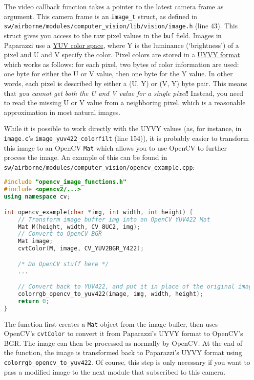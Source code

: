 \documentclass{article}
\begin{document}
The video callback function takes a pointer to the latest camera frame as argument.
This camera frame is an \texttt{image\_t} struct, as defined in \texttt{sw/airborne/modules/computer\_vision/lib/vision/image.h} (line 43).
This struct gives you access to the raw pixel values in the \texttt{buf} field.
Images in Paparazzi use a \href{https://en.wikipedia.org/wiki/YUV}{YUV color space}, where Y is the luminance (`brightness') of a pixel and U and V specify the color. Pixel colors are stored in a \href{https://www.fourcc.org/pixel-format/yuv-uyvy/}{UYVY format} which works as follows: for each pixel, two bytes of color information are used: one byte for either the U or V value, then one byte for the Y value. In other words, each pixel is described by either a (U, Y) or (V, Y) byte pair.
This means that \emph{you cannot get both the U and V value for a single pixel}! Instead, you need to read the missing U or V value from a neighboring pixel, which is a reasonable approximation in most natural images.

While it is possible to work directly with the UYVY values (as, for instance, in \texttt{image.c}'s \texttt{image\_yuv422\_colorfilt} (line 154)), it is probably easier to transform this image to an OpenCV \texttt{Mat} which allows you to use OpenCV to further process the image. An example of this can be found in \texttt{sw/airborne/modules/computer\_vision/opencv\_example.cpp}:

\begin{lstlisting}[language=c++]
#include "opencv_image_functions.h"
#include <opencv2/...>
using namespace cv;

int opencv_example(char *img, int width, int height) {
	// Transform image buffer img into an OpenCV YUV422 Mat
	Mat M(height, width, CV_8UC2, img);
	// Convert to OpenCV BGR
	Mat image;
	cvtColor(M, image, CV_YUV2BGR_Y422);

	/* Do OpenCV stuff here */
	...

	// Convert back to YUV422, and put it in place of the original image
	colorrgb_opencv_to_yuv422(image, img, width, height);
	return 0;
}
\end{lstlisting}
The function first creates a \texttt{Mat} object from the image buffer, then uses OpenCV's \texttt{cvtColor} to convert it from Paparazzi's UYVY format to OpenCV's BGR. The image can then be processed as normally by OpenCV.
At the end of the function, the image is transformed back to Paparazzi's UYVY format using \texttt{colorrgb\_opencv\_to\_yuv422}. Of course, this step is only necessary if you want to pass a modified image to the next module that subscribed to this camera.
\end{document}
